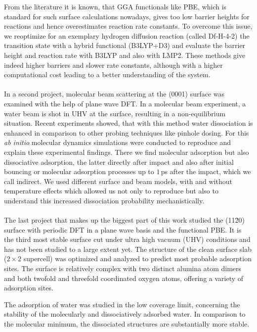\documentclass[11pt,DIV=13,a4paper,headinclude]{scrartcl}
\begin{document}
From the literature it is known, that GGA functionals like PBE, which is standard for such surface calculations nowadays, gives too low barrier heights for reactions and hence overestimates reaction rate constants.
To overcome this issue, we reoptimize for an exemplary hydrogen diffusion reaction (called Df-H-4-2) the transition state with a hybrid functional (B3LYP+D3) and evaluate the barrier height and reaction rate with B3LYP and also with LMP2.
These methods give indeed higher barriers and slower rate constants, although with a higher computational cost leading to a better understanding of the system.
\\
\\
In a second project, molecular beam scattering at the (0001) surface was examined with the help of plane wave DFT.
In a molecular beam experiment, a water beam is shot in UHV at the surface, resulting in a non-equilibrium situation.
Recent experiments showed, that with this method water dissociation is enhanced in comparison to other probing techniques like pinhole dosing.
For this \textit{ab initio} molecular dynamics simulations were conducted to reproduce and explain these experimental findings.
There we find molecular adsorption but also dissociative adsorption, the latter directly after impact and also after initial bouncing or molecular adsorption processes up to $1\,$ps after the impact, which we call indirect.
We used different surface and beam models, with and without temperature effects which allowed us not only to reproduce but also to understand this increased dissociation probability mechanistically.
\\
\\
The last project that makes up the biggest part of this work studied the (11\=20) surface with periodic DFT in a plane wave basis and the functional PBE.
It is the third most stable surface cut under ultra high vacuum (UHV) conditions and has not been studied to a large extent yet.
The structure of the clean surface slab ($2\times 2$ supercell) was optimized and analyzed to predict most probable adsorption sites.
The surface is relatively complex with two distinct alumina atom dimers and both twofold and threefold coordinated oxygen atoms, offering a variety of adsorption sites.

The adsorption of water was studied in the low coverage limit, concerning the stability of the molecularly and dissociatively adsorbed water.
In comparison to the molecular minimum, the dissociated structures are substantially more stable.
\end{document}
